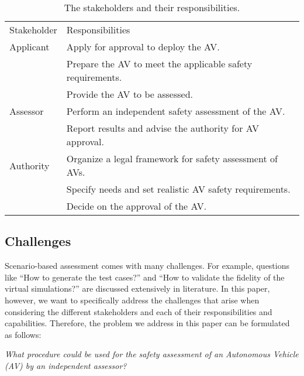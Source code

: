 \begin{table}
	\centering
	\caption{The stakeholders and their responsibilities.}
	\label{tab:stakeholders}
	\begin{tabularx}{\linewidth}{lX}
		\toprule
		Stakeholder & Responsibilities \\ \otoprule
		Applicant & Apply for approval to deploy the AV. \\
		& Prepare the AV to meet the applicable safety requirements. \\
		& Provide the AV to be assessed. \\ \otoprule
		Assessor & Perform an independent safety assessment of the AV. \\
		& Report results and advise the authority for AV approval. \\ \otoprule
		Authority & Organize a legal framework for safety assessment of AVs. \\
		& Specify needs and set realistic AV safety requirements. \\
		& Decide on the approval of the AV. \\
		\bottomrule
	\end{tabularx}
\end{table}



\subsection{Challenges}
\label{sec:challenges}

Scenario-based assessment comes with many challenges. For example, questions like ``How to generate the test cases?'' and ``How to validate the fidelity of the virtual simulations?'' are discussed extensively in literature. In this paper, however, we want to specifically address the challenges that arise when considering the different stakeholders and each of their responsibilities and capabilities. Therefore, the problem we address in this paper can be formulated as follows:

\emph{What procedure could be used for the safety assessment of an Autonomous Vehicle (AV) by an independent assessor?}

